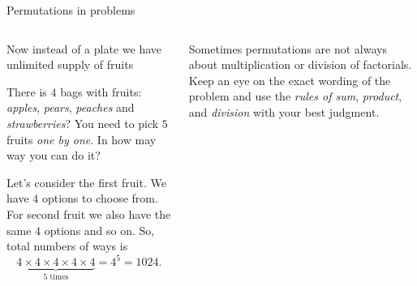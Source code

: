 \documentclass[9pt,aspectratio=169]{beamer}
\begin{document}
\begin{frame}{Permutations in problems}
  \begin{columns}[T]
    \begin{column}{0.5\textwidth}
      Now instead of a plate we have unlimited supply of fruits
      \begin{problem}
        There is $4$ bags with fruits: \emph{apples}, \emph{pears}, \emph{peaches} and \emph{strawberries}? You need to pick $5$ fruits \emph{one by one}. In how may way you can do it?
      \end{problem}

      \begin{nscenter}
      \end{nscenter}

      Let’s consider the first fruit. We have $4$ options to choose from. For second fruit we also have the same $4$ options and so on. So, total numbers of ways is 
      \[
        \underbrace{4 \times 4 \times 4 \times 4 \times 4}_\text{$5$ times} = 4^5 = 1024.
      \]
    \end{column}
    \begin{column}{0.5\textwidth}
      \begin{definition}
        Sometimes permutations are not always about multiplication or division of factorials. Keep an eye on the exact wording of the problem and use the \emph{rules of sum}, \emph{product}, and \emph{division} with your best judgment.
      \end{definition}
    

\end{column}
\end{columns}
\end{frame}
\end{document}
